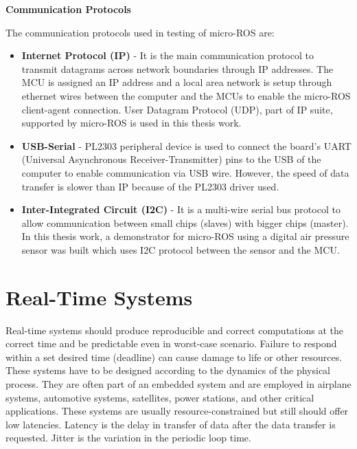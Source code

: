 \documentclass[%
xelatex,
	oneside,		%
	12pt,			%
	parskip=half,	%
	abstracton,
	chapterprefix=true%
    appendixprefix=true]
{scrbook}
\begin{document}
{\bfseries Communication Protocols}
	
	
\vspace*{0.5cm}
The communication protocols used in testing of micro-ROS are:
\begin{itemize}
\item {\bfseries Internet Protocol (IP)} - It is the main communication protocol to transmit datagrams across network boundaries through IP addresses. The MCU is assigned an IP address and a local area network is setup through ethernet wires between the computer and the MCUs to enable the micro-ROS client-agent connection. User Datagram Protocol (UDP), part of IP suite, supported by micro-ROS is used in this thesis work.
\item {\bfseries USB-Serial} - PL2303 peripheral device is used to connect the board’s UART (Universal Asynchronous Receiver-Transmitter) pins to the USB of the computer to enable communication via USB wire. However, the speed of data transfer is slower than IP because of the PL2303 driver used.
\item {\bfseries Inter-Integrated Circuit (I2C)} - It is a multi-wire serial bus protocol to allow communication between small chips (slaves) with bigger chips (master). In this thesis work, a demonstrator for micro-ROS using a digital air pressure sensor was built which uses I2C protocol between the sensor and the MCU.
\end{itemize}

	
	\section{Real-Time Systems}
	
	
	\vspace*{0.5cm}	
Real-time systems should produce reproducible and correct computations at the correct time and be predictable even in worst-case scenario. Failure to respond within a set desired time (deadline) can cause damage to life or other resources. These systems have to be designed according to the dynamics of the physical process. They are often part of an embedded system and are employed in airplane systems, automotive systems, satellites, power stations, and other critical applications. These systems are usually resource-constrained but still should offer low latencies. Latency is the delay in transfer of data after the data transfer is requested. Jitter is the variation in the periodic loop time.
	
\end{document}
